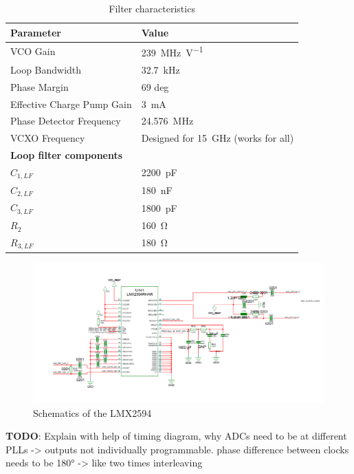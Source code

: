 \begin{table}[tbh]
	\caption[LMX2594 Filter characteristics]{Filter characteristics}
	\label{tab:lmx2594_filter}
	\centering
	\begin{tabularx}{\textwidth}{Xl}
		\toprule
		\textbf{Parameter} & \textbf{Value} \\
		\bottomrule
		 VCO Gain & \SI{239}{\mega \hertz \per \volt} \\
		 Loop Bandwidth	 & \SI{32.7}{\kilo \hertz} \\
		 Phase Margin	 & 69 deg \\
		 Effective Charge Pump Gain	 & \SI{3}{\milli \ampere} \\
		 Phase Detector Frequency & \SI{24.576}{\mega \hertz}\\
		 VCXO Frequency	& Designed for \SI{15}{\giga \hertz} (works for all)\\ [0.3cm]
		 \textbf{Loop filter components} & \\
		 $C_{1,LF}$ &  \SI{2200}{\pico \farad}\\
		 $C_{2,LF}$ &  \SI{180}{\nano \farad}\\
		 $C_{3,LF}$ &  \SI{1800}{\pico \farad}\\
		 $R_{2}$ &  \SI{160}{\ohm}\\
		 $R_{3,LF}$ &  \SI{180}{\ohm}\\
		 \bottomrule
	\end{tabularx}
\end{table}


\begin{figure}[tbh]
	\centering
	\includegraphics[width = \textwidth]{chap/04-work/img/lmx2594}
	\caption{Schematics of the LMX2594}
	\label{fig:lmx2594}
\end{figure}

\textbf{TODO}: Explain with help of timing diagram, why ADCs need to be at different PLLs -> outputs not individually programmable. phase difference between clocks needs to be 180° -> like two times interleaving

